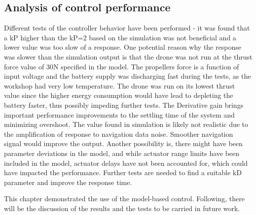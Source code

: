 \subsection{Analysis of control performance}

Different tests of the controller behavior have been performed - it was found that a kP higher than the kP=2 based on the simulation was not beneficial and a lower value was too slow of a response. 
One potential reason why the response was slower than the simulation output is that the drone was not run at the thrust force value of 30N specified in the model. The propellers force is a function of input voltage and the battery supply was discharging fast during the tests, as the workshop had very low temperature. The drone was run on its lowest thrust value since the higher energy consumption would have lead to depleting the battery faster, thus possibly impeding further tests. 
The Derivative gain brings important performance improvements to the settling time of the system and minimizing overshoot. The value found in simulation is likely not realistic due to the amplification of response to navigation data noise. Smoother navigation signal would improve the output. Another possibility is, there might have been parameter deviations in the model, and while actuator range limits have been included in the model, actuator delays have not been accounted for, which could have impacted the performance. Further tests are needed to find a suitable kD parameter and improve the response time. 



This chapter demonstrated the use of the model-based control. Following, there will be the discussion of the results and the tests to be carried in future work. 
